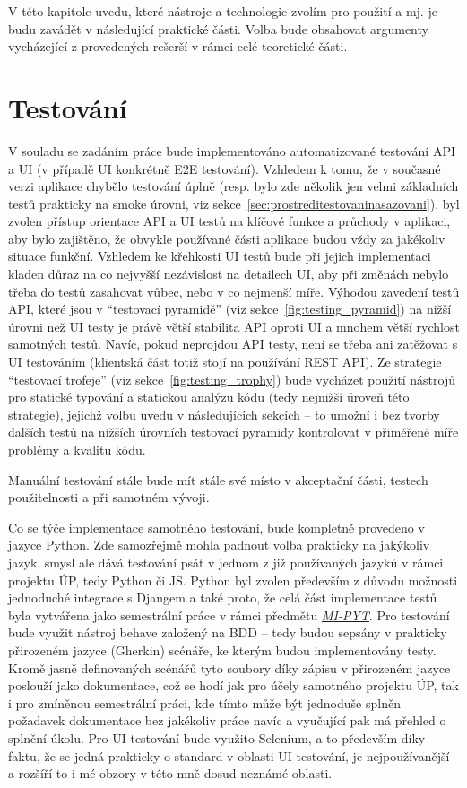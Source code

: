 V této kapitole uvedu, které nástroje a technologie zvolím pro použití a mj. je budu zavádět v následující praktické části. Volba bude obsahovat argumenty vycházející z provedených rešerší v rámci celé teoretické části.

\section{Testování}\label{sec:zvolenetechnologie-testovani}

V souladu se zadáním práce bude implementováno automatizované testování API a UI (v případě UI konkrétně E2E testování). Vzhledem k tomu, že v současné verzi aplikace chybělo testování úplně (resp. bylo zde několik jen velmi základních testů prakticky na smoke úrovni, viz sekce~\ref{sec:prostreditestovaninasazovani}), byl zvolen přístup orientace API a UI testů na klíčové funkce a průchody v aplikaci, aby bylo zajištěno, že obvykle používané části aplikace budou vždy za jakékoliv situace funkční. Vzhledem ke křehkosti UI testů bude při jejich implementaci kladen důraz na co nejvyšší nezávislost na detailech UI, aby při změnách nebylo třeba do testů zasahovat vůbec, nebo v co nejmenší míře. Výhodou zavedení testů API, které jsou v \enquote{testovací pyramidě} (viz sekce~\ref{fig:testing_pyramid}) na nižší úrovni než UI testy je právě větší stabilita API oproti UI a mnohem větší rychlost samotných testů. Navíc, pokud neprojdou API testy, není se třeba ani zatěžovat s UI testováním (klientská část totiž stojí na používání REST API). Ze strategie \enquote{testovací trofeje} (viz sekce~\ref{fig:testing_trophy}) bude vycházet použití nástrojů pro statické typování a statickou analýzu kódu (tedy nejnižší úroveň této strategie), jejichž volbu uvedu v následujících sekcích -- to umožní i bez tvorby dalších testů na nižších úrovních testovací pyramidy kontrolovat v přiměřené míře problémy a kvalitu kódu.

Manuální testování stále bude mít stále své místo v akceptační části, testech použitelnosti a při samotném vývoji.

Co se týče implementace samotného testování, bude kompletně provedeno v jazyce Python. Zde samozřejmě mohla padnout volba prakticky na jakýkoliv jazyk, smysl ale dává testování psát v jednom z již používaných jazyků v rámci projektu ÚP, tedy Python či JS. Python byl zvolen především z důvodu možnosti jednoduché integrace s Djangem a také proto, že celá část implementace testů byla vytvářena jako semestrální práce v rámci předmětu \textit{\href{https://courses.fit.cvut.cz/MI-PYT/}{MI-PYT}}. Pro testování bude využit nástroj behave založený na BDD -- tedy budou sepsány v prakticky přirozeném jazyce (Gherkin) scénáře, ke kterým budou implementovány testy. Kromě jasně definovaných scénářů tyto soubory díky zápisu v přirozeném jazyce poslouží jako dokumentace, což se hodí jak pro účely samotného projektu ÚP, tak i pro zmíněnou semestrální práci, kde tímto může být jednoduše splněn požadavek dokumentace bez jakékoliv práce navíc a vyučující pak má přehled o splnění úkolu. Pro UI testování bude využito Selenium, a to především díky faktu, že se jedná prakticky o standard v oblasti UI testování, je nejpoužívanější a rozšíří to i mé obzory v této mně dosud neznámé oblasti.

